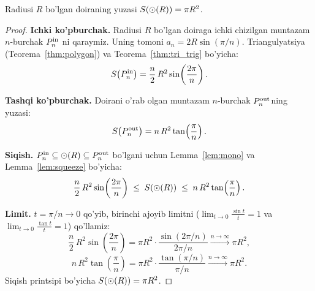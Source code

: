 \begin{teorema}
\label{thm:circle}
Radiusi $R$ bo'lgan doiraning yuzasi $S\!\left(\odot(R)\right) = \pi R^2$.
\end{teorema}
\begin{proof}
\textbf{Ichki ko'pburchak.}
Radiusi $R$ bo'lgan doiraga ichki chizilgan muntazam $n$-burchak $P_n^{\rm in}$
ni qaraymiz. Uning tomoni $a_n = 2R\sin(\pi/n)$.
Triangulyatsiya (Teorema~\ref{thm:polygon}) va Teorema~\ref{thm:tri_trig} bo'yicha:
\[
  S\!\left(P_n^{\rm in}\right) = \frac{n}{2}\,R^2\sin\!\left(\frac{2\pi}{n}\right).
\]

\textbf{Tashqi ko'pburchak.}
Doirani o'rab olgan muntazam $n$-burchak $P_n^{\rm out}$ning yuzasi:
\[
  S\!\left(P_n^{\rm out}\right) = n\,R^2\tan\!\left(\frac{\pi}{n}\right).
\]

\textbf{Siqish.}
$P_n^{\rm in} \subseteq \odot(R) \subseteq P_n^{\rm out}$ bo'lgani uchun
Lemma~\ref{lem:mono} va Lemma~\ref{lem:squeeze} bo'yicha:
\[
  \frac{n}{2}\,R^2\sin\!\left(\frac{2\pi}{n}\right)
  \;\le\;
  S\!\left(\odot(R)\right)
  \;\le\;
  n\,R^2\tan\!\left(\frac{\pi}{n}\right).
\]

\textbf{Limit.}
$t = \pi/n \to 0$ qo'yib, birinchi ajoyib limitni ($\lim_{t\to 0}\tfrac{\sin t}{t}=1$
va $\lim_{t\to 0}\tfrac{\tan t}{t}=1$) qo'llamiz:
\[
  \frac{n}{2}\,R^2\sin\!\left(\frac{2\pi}{n}\right)
  = \pi R^2 \cdot \frac{\sin(2\pi/n)}{2\pi/n}
  \xrightarrow{n\to\infty} \pi R^2,
\]
\[
  n\,R^2\tan\!\left(\frac{\pi}{n}\right)
  = \pi R^2 \cdot \frac{\tan(\pi/n)}{\pi/n}
  \xrightarrow{n\to\infty} \pi R^2.
\]
Siqish printsipi bo'yicha $S\!\left(\odot(R)\right) = \pi R^2$. \qedhere
\end{proof}

